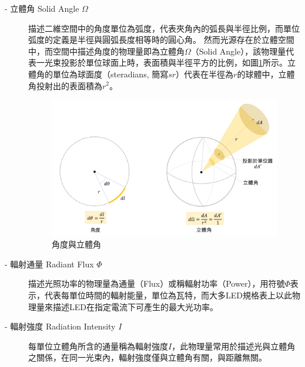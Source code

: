         
        \begin{description}
            \item[- 立體角 Solid Angle $\Omega$] \hfill
                
                \qquad
                描述二維空間中的角度單位為弧度，代表夾角內的弧長與半徑比例，而單位弧度的定義是半徑與圓弧長度相等時的圓心角。
                \qquad
                然而光源存在於立體空間中，而空間中描述角度的物理量即為立體角$\Omega$（Solid Angle），該物理量代表一光束投影於單位球面上時，表面積與半徑平方的比例，如圖\ref{pic:solid_angle}所示。立體角的單位為球面度（steradians, 簡寫$sr$）代表在半徑為$r$的球體中，立體角投射出的表面積為$r^2$。

                \begin{figure}[ht]
                    \centering
                    \includegraphics[width=12cm]{ch2pic/solid_angle.png}
                    \caption{角度與立體角}
                    \label{pic:solid_angle}
                \end{figure}

            \item[- 輻射通量 Radiant Flux $\Phi$]  \hfill
                
                \qquad
                描述光照功率的物理量為通量（Flux）或稱輻射功率（Power），用符號$\Phi$表示，代表每單位時間的輻射能量，單位為瓦特，而大多LED規格表上以此物理量來描述LED在指定電流下可產生的最大光功率。

            \item[- 輻射強度 Radiation Intensity $I$] \hfill
             
                \qquad
                每單位立體角所含的通量稱為輻射強度$I$，此物理量常用於描述光與立體角之關係，在同一光束內，輻射強度僅與立體角有關，與距離無關。


\end{description}
